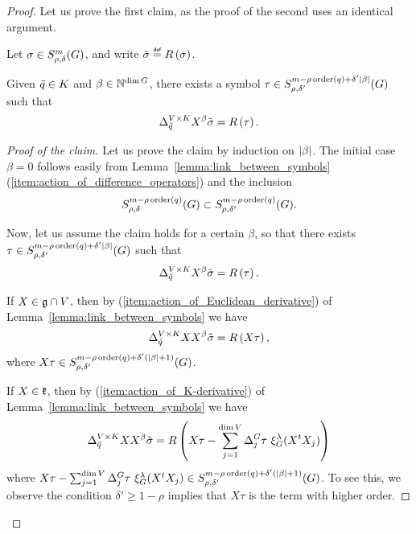 \begin{proof}
    Let us prove the first claim,
    as the proof of the second uses an identical argument.

    Let $\sigma \in \SymbolClass m {\rho, \delta}$,
    and write $\tilde \sigma \defeq \InverseRotation \sigma$.

    \begin{claim}
        Given $\tilde{q} \in \CompactGroup$ and $\beta \in \N^{\dim \Group}$,
        there exists a symbol $\tau \in \SymbolClass {m - \rho \order(q) + \delta' \abs \beta} {\rho, \delta'}$ such that
        \begin{align*}
            \DifferenceOperator [\GroupDirect] {\tilde q} X^\beta \tilde \sigma = \InverseRotation \tau.
        \end{align*}
    \end{claim}
    \begin{proof}[Proof of the claim]
        Let us prove the claim by induction on $\abs \beta$.
        The initial case $\beta = 0$ follows easily from Lemma~\ref{lemma:link_between_symbols} (\ref{item:action_of_difference_operators})
        and the inclusion
        \begin{align*}
            \SymbolClass {m - \rho \order(q)} {\rho, \delta} \subset \SymbolClass {m - \rho \order(q)} {\rho, \delta'}.
        \end{align*}

        Now, let us assume the claim holds for a certain $\beta$,
        so that there exists $\tau \in \SymbolClass {m - \rho \order(q) + \delta' \abs \beta} {\rho, \delta'}$ such that
        \begin{align*}
            \DifferenceOperator [\GroupDirect] {\tilde q} X^\beta \tilde \sigma = \InverseRotation \tau.
        \end{align*}

        If $X \in \LieAlgebra \cap \VectorSpace$,
        then by (\ref{item:action_of_Euclidean_derivative}) of Lemma~\ref{lemma:link_between_symbols} we have
        \begin{align*}
            \DifferenceOperator [\GroupDirect] {\tilde q} X X^\beta \tilde \sigma = \InverseRotation {X \tau},
        \end{align*}
        where $X \tau \in \SymbolClass {m - \rho \order(q) + \delta' (\abs \beta + 1)} {\rho, \delta'}$.

        If $X \in \LieAlgebraCompactGroup$,
        then by (\ref{item:action_of_K-derivative}) of Lemma~\ref{lemma:link_between_symbols} we have
        \begin{align*}
            \DifferenceOperator [\GroupDirect] {\tilde q} X X^\beta \tilde \sigma = \InverseRotation {X \tau - \sum_{j = 1}^{\dim \VectorSpace} \DifferenceOperator{j} \tau \ \Rep {\lambda} (X^t X_j) }
        \end{align*}
        where $X \tau - \sum_{j = 1}^{\dim \VectorSpace} \DifferenceOperator{j} \tau \ \Rep {\lambda} (X^t X_j) \in \SymbolClass {m - \rho \order(q) + \delta' (\abs \beta + 1)} {\rho, \delta'}$.
        To see this,
        we observe the condition $\delta' \geq 1 - \rho$ implies that $X \tau$ is the term with higher order.


\end{proof}
\end{proof}
